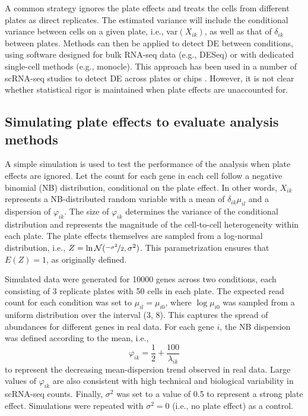 \documentclass{article}
\begin{document}
A common strategy ignores the plate effects and treats the cells from different plates as direct replicates.
The estimated variance will include the conditional variance between cells on a given plate, i.e., var$(X_{ik})$, as well as that of $\delta_{ik}$ between plates.
Methods can then be applied to detect DE between conditions, using software designed for bulk RNA-seq data (e.g., DESeq) or with dedicated single-cell methods (e.g., monocle).
This approach has been used in a number of scRNA-seq studies to detect DE across plates or chips \cite{kolod2015single,trapnell2014dynamics,avraham2015pathogen}.
However, it is not clear whether statistical rigor is maintained when plate effects are unaccounted for.


\subsection{Simulating plate effects to evaluate analysis methods}
A simple simulation is used to test the performance of the analysis when plate effects are ignored.
Let the count for each gene in each cell follow a negative binomial (NB) distribution, conditional on the plate effect.
In other words, $X_{ik}$ represents a NB-distributed random variable with a mean of $\delta_{ik}\mu_{il}$ and a dispersion of $\varphi_{ik}$.
The size of $\varphi_{ik}$ determines the variance of the conditional distribution and represents the magnitude of the cell-to-cell heterogeneity within each plate.
The plate effects themselves are sampled from a log-normal distribution, i.e., $Z = \ln \mathcal{N}(\nicefrac{-\sigma^2}{2}, \sigma^2)$.
This parametrization ensures that $E(Z)=1$, as originally defined.

Simulated data were generated for 10000 genes across two conditions, each consisting of 3 replicate plates with 50 cells in each plate.
The expected read count for each condition was set to $\mu_{il}=\mu_{i0}$, where $\log \mu_{i0}$ was sampled from a uniform distribution over the interval (3, 8).
This captures the spread of abundances for different genes in real data. 
For each gene $i$, the NB dispersion was defined according to the mean, i.e., 
\[
    \varphi_{ik} = \frac{1}{2} + \frac{100}{\lambda_{ik}} 
\]
to represent the decreasing mean-dispersion trend observed in real data.
Large values of $\varphi_{ik}$ are also consistent with high technical and biological variability in scRNA-seq counts.
Finally, $\sigma^2$ was set to a value of 0.5 to represent a strong plate effect.
Simulations were repeated with $\sigma^2=0$ (i.e., no plate effect) as a control. 
\end{document}
